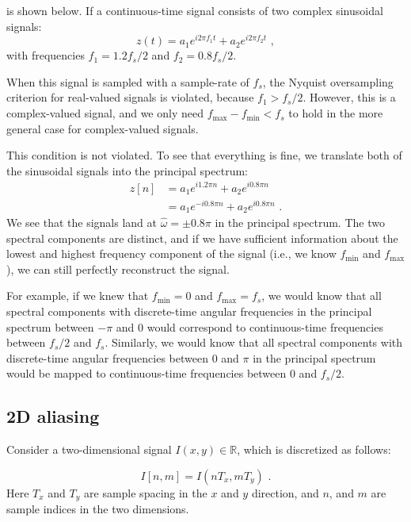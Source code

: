  is shown below. 
If a continuous-time signal consists of two complex sinusoidal signals:
\begin{equation}
  z(t)=a_1 e^{i 2\pi f_1 t} + a_2 e^{i 2\pi f_2 t}\,\,,
\end{equation}
with frequencies $f_1= 1.2 f_s/2$ and $f_2=0.8 f_s/2$.

When this signal is sampled with a sample-rate of $f_s$, the Nyquist oversampling criterion 
for real-valued signals is violated, because $f_1 > f_s/2$.
However, this is a complex-valued signal, and we only need $f_{\mathrm{max}} - f_{\mathrm{min}} < f_s$ 
to hold in the more general case for complex-valued signals.

This condition is not violated. To see that everything is fine, we
translate both of the sinusoidal signals into the principal spectrum:
\begin{align}
  z[n] & = a_1 e^{i 1.2\pi n }+ a_2 e^{i 0.8\pi n }       \\
       & = a_1 e^{-i 0.8\pi n }+ a_2 e^{i 0.8\pi n }\,\,.
\end{align}
We see that the signals land at $\hat{\omega} = \pm 0.8\pi$ in the
principal spectrum. The two spectral components are distinct, and if we have sufficient information 
about the lowest and highest frequency component of the signal 
(i.e., we know $f_{\mathrm{min}}$ and $f_{\mathrm{max}}$), 
we can still perfectly reconstruct the signal.

  For example, if we knew that $f_{\mathrm{min}} = 0$ and $f_{\mathrm{max}} = f_s$, 
  we would know that all spectral components with discrete-time angular frequencies in 
  the principal spectrum between $-\pi$ and $0$ would correspond to continuous-time frequencies 
  between $f_s/2$ and $f_s$. Similarly, we would know that all spectral components with 
  discrete-time angular frequencies between 0 and $\pi$ in the principal spectrum would be 
  mapped to continuous-time frequencies between 0 and $f_s/2$.
\fi

\subsection{2D aliasing}
Consider a two-dimensional signal $I(x,y) \in \mathbb{R}$, which is discretized as follows:

\begin{equation}
  I[n,m]=I(n T_x, m T_y)\,\,.
\end{equation}
Here $T_x$ and $T_y$ are sample spacing in the $x$ and $y$ direction, and $n$, and $m$ are sample 
indices in the two dimensions.

